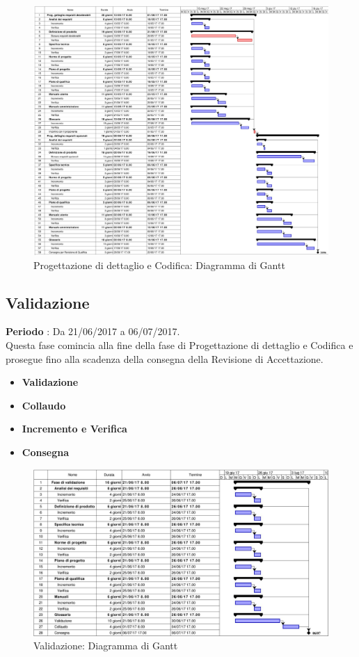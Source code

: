 \documentclass[../PianoDiProgetto.tex]{subfiles}
\begin{document}
		\begin{figure}[H]
			\centering
			\includegraphics[scale=0.7]{Figures/Gantt_DettaglioOpz}
			\caption{Progettazione di dettaglio e Codifica: Diagramma di Gantt}
		\end{figure}
	
	
		
		\subsection{Validazione}
		\textbf{Periodo} : Da 21/06/2017 a 06/07/2017. \\
		Questa fase comincia alla fine della fase di Progettazione di dettaglio e Codifica e prosegue fino alla scadenza della consegna della Revisione di Accettazione.
		\begin{itemize}
			\item \textbf{Validazione}
			\item \textbf{Collaudo}
			\item \textbf{Incremento e Verifica}
			\item \textbf{Consegna}
		\end{itemize}
		\begin{figure}[H]
			\centering
			\includegraphics[scale=0.55]{Figures/Gantt_Validazione.jpg}
			\caption{Validazione: Diagramma di Gantt}
		\end{figure}
			
\end{document}
